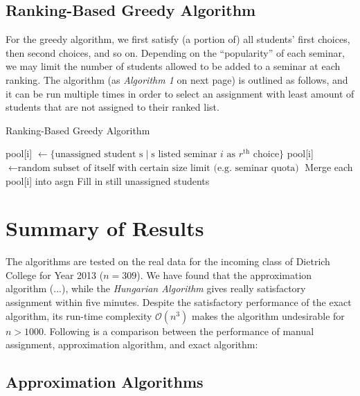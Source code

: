 \documentclass{article} %
\begin{document}
\subsection{Ranking-Based Greedy Algorithm}
    \par For the greedy algorithm, we first satisfy (a portion of) all students' first choices, then second choices, and so on. Depending on the ``popularity'' of each seminar, we may limit the number of students allowed to be added to a seminar at each ranking. The algorithm (as \emph{Algorithm 1} on next page) is outlined as follows, and it can be run multiple times in order to select an assignment with least amount of students that are not assigned to their ranked list.
    \begin{algorithm}
        \caption{Ranking-Based Greedy Algorithm}
        \begin{algorithmic}
                    \State pool[i] $\gets \{\text{unassigned student s} \mid \text{s listed seminar $i$ as $r^\text{th}$ choice}\}$
                    \State pool[i] $\gets \text{random subset of itself with certain size limit (e.g. seminar quota)}$
                \EndFor
                \State Merge each pool[i] into asgn
            \EndFor
            \State Fill in still unassigned students
        \end{algorithmic}
    \end{algorithm}

%
%
\section{Summary of Results}
    \par\qquad The algorithms are tested on the real data for the incoming class of Dietrich College for Year 2013 ($n=309$). We have found that the approximation algorithm (...), while the \emph{Hungarian Algorithm} gives really satisfactory assignment within five minutes. Despite the satisfactory performance of the exact algorithm, its run-time complexity $\mathcal{O}(n^3)$ makes the algorithm undesirable for $n>1000$. Following is a comparison between the performance of manual assignment, approximation algorithm, and exact algorithm:

\subsection{Approximation Algorithms}
\end{document}
